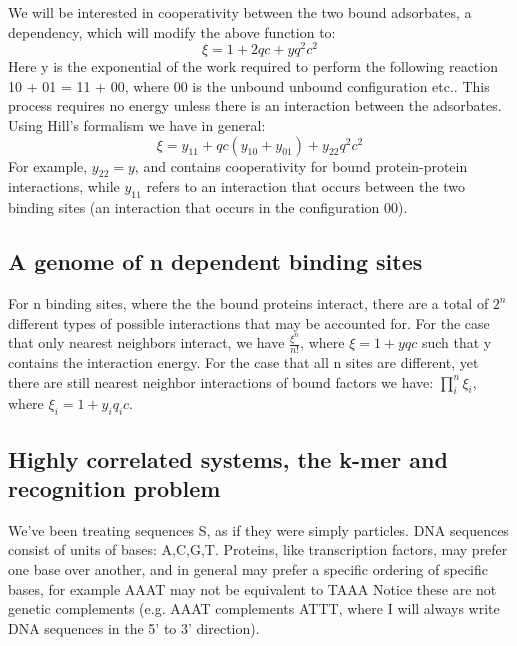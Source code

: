 We will be interested in cooperativity between the two bound adsorbates, a dependency, which will modify the above function to:
\begin{equation}\label{}
  \xi = 1 + 2qc + y q^2 c^2
\end{equation}
Here y is the exponential of the work required to perform the following reaction 10 + 01 = 11 + 00, where 00 is the unbound unbound configuration etc..  This process requires no energy unless there is an interaction between the adsorbates.  Using Hill's formalism we have in general:
\begin{equation}\label{y11}
   \xi = y_{11} + qc(y_{10} + y_{01}) + y_{22}q^2 c^2
\end{equation}
For example, $y_{22}=y$, and contains cooperativity for bound protein-protein interactions, while $y_{11}$ refers to an interaction that occurs between the two binding sites (an interaction that occurs in the configuration 00).

\subsection{ A genome of n dependent binding sites}
For n binding sites, where the the bound proteins interact, there are a total of $2^n$ different types of possible interactions that may be accounted for.  For the case that only nearest neighbors interact, we have $\frac{\xi^n}{n!}$, where $\xi=1+yqc$ such that y contains the interaction energy.  For the case that all n sites are different, yet there are still nearest neighbor interactions of bound factors we have: $\prod_i^n \xi_i$, where $\xi_i=1+y_i q_i c$.

\subsection{ Highly correlated systems, the k-mer and recognition problem}


We've been treating sequences S, as if they were simply particles. DNA sequences consist of units of bases: A,C,G,T.  Proteins, like transcription factors, may prefer one base over another, and in general may prefer a specific ordering of specific bases, for example AAAT may not be equivalent to TAAA  Notice these are not genetic complements (e.g. AAAT complements ATTT, where I will always write DNA sequences in the 5' to 3' direction). 

